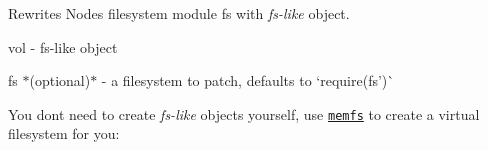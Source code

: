 Rewrites Node\textquotesingle{}s filesystem module {\ttfamily fs} with {\itshape fs-\/like} object.


\begin{DoxyItemize}
\item {\ttfamily vol} -\/ fs-\/like object
\item {\ttfamily fs} $\ast$(optional)$\ast$ -\/ a filesystem to patch, defaults to `require(\textquotesingle{}fs')\`{}
\end{DoxyItemize}


\begin{DoxyCode}{0}
\DoxyCodeLine{}
\DoxyCodeLine{\};}
\DoxyCodeLine{}

\end{DoxyCode}


You don\textquotesingle{}t need to create {\itshape fs-\/like} objects yourself, use \href{https://github.com/streamich/memfs}{\texttt{ {\ttfamily memfs}}} to create a virtual filesystem for you\+:


\begin{DoxyCode}{0}
\DoxyCodeLine{}

\end{DoxyCode}
 